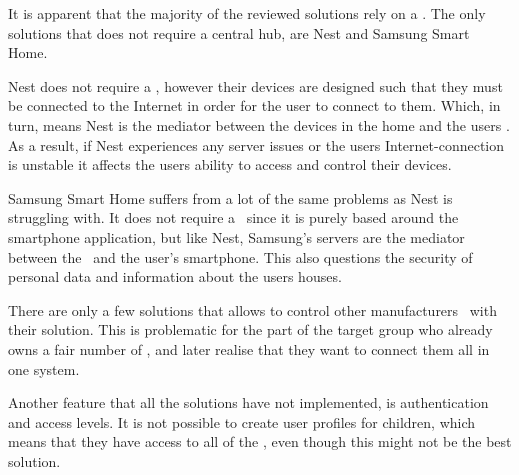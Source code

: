 It is apparent that the majority of the reviewed solutions rely on a \hub. The only solutions that does not require a central hub, are Nest and Samsung Smart Home.  

Nest does not require a \hub, however their devices are designed such that they must be connected to the Internet in order for the user to connect to them. Which, in turn, means Nest is the mediator between the devices in the home and the users \phone. As a result, if Nest experiences any server issues or the users Internet-connection is unstable it affects the users ability to access and control their devices. 

Samsung Smart Home suffers from a lot of the same problems as Nest is struggling with. It does not require a \hub~since it is purely based around the smartphone application, but like Nest, Samsung's servers are the mediator between the \sdevs~and the user's smartphone. This also questions the security of personal data and information about the users houses.

There are only a few solutions that allows to control other manufacturers \sdevs~with their solution. This is problematic for the part of the target group who already owns a fair number of \sdevs, and later realise that they want to connect them all in one system.

Another feature that all the solutions have not implemented, is authentication and access levels. It is not possible to create user profiles for children, which means that they have access to all of the \sdevs, even though this might not be the best solution. 

